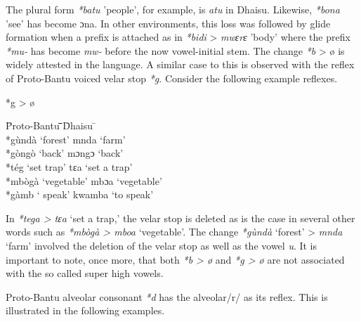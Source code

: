 \documentclass[output=paper,colorlinks,citecolor=brown]{langscibook}
\begin{document}
The plural form \textit{*batu}  'people', for example, is \textit{atu} in Dhaisu. Likewise, \textit{*bona} 'see' has become ɔna. In other environments, this loss was followed by glide formation when a prefix is attached as in \textit{*bidi} > \textit{mwɛrɛ} 'body' where the prefix  \textit{*mu-} has become \textit{mw-} before the now vowel-initial stem. The change \textit{*b} > ø is widely attested in the language. A similar case to this is observed with the reflex of Proto-Bantu voiced velar stop \textit{*g}. Consider the following example reflexes. 

\ea%
    \label{ex:ngonyani:7}
    *g > ø\\
	\begin{tabbing} 
        \= Proto-Bantu \quad\= \quad\= \quad\= \quad\= \quad\= \quad\= \quad\= Dhaisu \quad\=  \quad\= \\
        \> *gùndà
        \> ‘forest’\> \> \>  \> \> \> 
        mnda
        \> ‘farm’\\
        \> *gòngò
        \> ‘back’ \> \> \>  \> \> \> 
        mɔngɔ
        \> ‘back’\\
        \> *tég
        \> ‘set trap’\> \> \>  \> \> \> 
        tɛa
        \> ‘set a trap’\\
        \> *mbògà
        \> ‘vegetable’\> \> \>  \> \> \> 
        mbɔa
        \> ‘vegetable’\\
        \> *gàmb
        ‘\> speak’\> \> \>  \> \> \> 
        kwamba
        \> ‘to speak’
   \end{tabbing}
\z

In \textit{*tega > tɛa} ‘set a trap,’ the velar stop is deleted as is the case in several other words such as \textit{*mbògà > mboa} ‘vegetable’. The change \textit{*gùndà} ‘forest’ > \textit{mnda} ‘farm’ involved the deletion of the velar stop as well as the vowel \textit{u}. It is important to note, once more, that both \textit{*b > ø} and \textit{*g > ø} are not associated with the so called super high vowels. 

Proto-Bantu alveolar consonant \textit{*d} has the alveolar/r/ as its reflex. This is illustrated in the following examples. 
\end{document}
